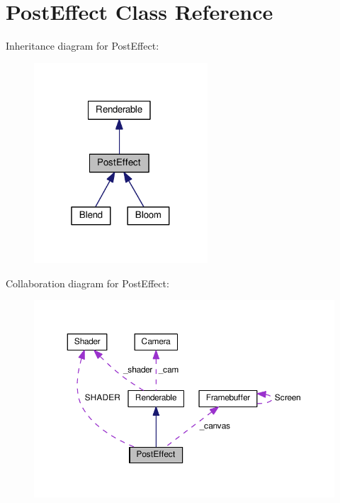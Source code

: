 \hypertarget{class_post_effect}{}\section{Post\+Effect Class Reference}
\label{class_post_effect}


Inheritance diagram for Post\+Effect\+:\nopagebreak
\begin{figure}[H]
\begin{center}
\leavevmode
\includegraphics[width=184pt]{class_post_effect__inherit__graph}
\end{center}
\end{figure}


Collaboration diagram for Post\+Effect\+:\nopagebreak
\begin{figure}[H]
\begin{center}
\leavevmode
\includegraphics[width=350pt]{class_post_effect__coll__graph}
\end{center}
\end{figure}
